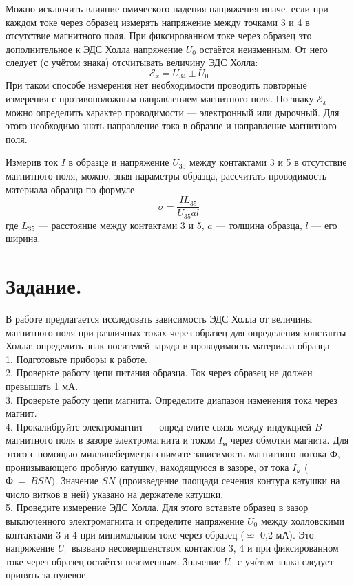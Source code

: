 Можно исключить влияние омического падения напряжения иначе, если при каждом токе через образец измерять напряжение между точками 3 и 4 в отсутствие магнитного поля. При фиксированном токе через образец это дополнительное к ЭДС Холла напряжение $U_0$ остаётся неизменным. От него следует (с учётом знака) отсчитывать величину ЭДС Холла:
\begin{equation}\label{4}
    \mathscr{E}_x = U_{34} \pm U_0
\end{equation}
При таком способе измерения нет необходимости проводить повторные измерения с противоположным направлением магнитного поля.
     По знаку $\mathscr{E}_x$ можно определить характер проводимости — электронный или дырочный. Для этого необходимо знать направление тока в образце и направление магнитного поля.
     
     Измерив ток $I$ в образце и напряжение $U_{35}$ между контактами 3 и 5 в отсутствие магнитного поля, можно, зная параметры образца, рассчитать проводимость материала образца по формуле
\begin{equation}\label{5}
    \sigma = \frac{I L_{35}}{U_{35} a l}
\end{equation}    
где $L_{35}$ — расстояние между контактами 3 и 5, $a$ — толщина образца, $l$ — его ширина.
   
\section{\label{sec:level1}Задание.}

В работе предлагается исследовать зависимость ЭДС Холла от величины магнитного поля при различных токах через образец для определения константы Холла; определить знак носителей заряда и проводимость материала образца.\\
 1. Подготовьте приборы к работе.\\
 2. Проверьте работу цепи питания образца. Ток через образец не должен превышать 1 мА.\\
 3. Проверьте работу цепи магнита. Определите диапазон изменения тока через магнит.\\
 4. Прокалибруйте электромагнит — опред елите связь между индукцией $B$ магнитного поля в зазоре электромагнита и током $I_{\text{м}}$ через обмотки магнита. Для этого с помощью милливеберметра снимите зависимость магнитного потока Ф, пронизывающего пробную катушку, находящуюся в зазоре, от тока $I_{\text{м}}$ ($\text{Ф}~=~BSN)$. Значение $SN$ (произведение площади сечения контура катушки на число витков в ней) указано на держателе катушки.\\
5. Проведите измерение ЭДС Холла. Для этого вставьте образец в зазор выключенного электромагнита и определите напряжение $U_0$ между холловскими контактами 3 и 4 при минимальном токе через образец ($\backsimeq$ 0,2 мА). Это напряжение $U_0$ вызвано несовершенством контактов 3, 4 и при фиксированном токе через образец остаётся неизменным. Значение $U_0$ с учётом знака следует принять за нулевое.


